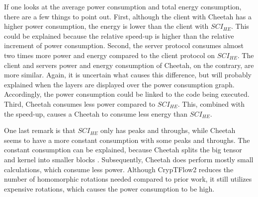 \documentclass[../thesis.tex]{subfiles}
\begin{document}
If one looks at the average power consumption and total energy consumption, there are a few things to point out. First, although the client with Cheetah has a higher power consumption, the energy is lower than the client with $SCI_{HE}$. This could be explained because the relative speed-up is higher than the relative increment of power consumption. Second, the server protocol consumes almost two times more power and energy compared to the client protocol on $SCI_{HE}$. The client and servers power and energy consumption of Cheetah, on the contrary, are more similar. Again, it is uncertain what causes this difference, but will probably explained when the layers are displayed over the power consumption graph. Accordingly, the power consumption could be linked to the code being executed. Third, Cheetah consumes less power compared to $SCI_{HE}$. This, combined with the speed-up, causes a Cheetah to consume less energy than $SCI_{HE}$. 


One last remark is that $SCI_{HE}$ only has peaks and throughs, while Cheetah seems to have a more constant consumption with some peaks and throughs. The constant consumption can be explained, because Cheetah splits the big tensor and kernel into smaller blocks \parencite[p. 8]{cheetah}. Subsequently, Cheetah does perform mostly small calculations, which consume less power. Although CrypTFlow2 reduces the number of homomorphic rotations needed compared to prior work, it still utilizes expensive rotations, which causes the power consumption to be high. 
 
\end{document}
